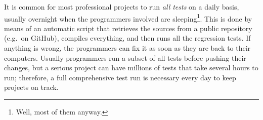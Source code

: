 It is common for most professional projects to run \emph{all tests}
on a daily basis, usually overnight when the programmers involved are
sleeping\footnote{Well, most of them anyway.}. This is done by means
of an automatic script that retrieves the sources from a public
repository (e.g.~on GitHub), compiles everything, and then runs all
the regression tests. If anything is wrong, the programmers can fix it
as soon as they are back to their computers. Usually programmers run
a subset of all tests before pushing their changes, but a serious
project can have millions of tests that take several hours to run;
therefore, a full comprehensive test run is necessary every day to
keep projects on track. 



